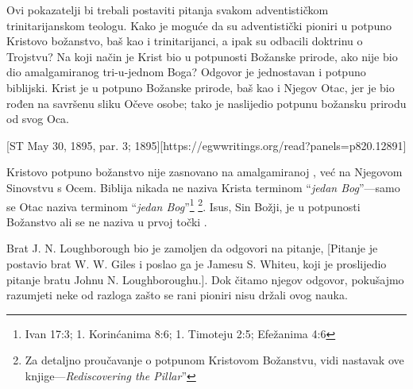 Ovi pokazatelji bi trebali postaviti pitanja svakom adventističkom trinitarijanskom teologu. Kako je moguće da su adventistički pioniri u potpuno Kristovo božanstvo, baš kao i trinitarijanci, a ipak su odbacili doktrinu o Trojstvu? Na koji način je Krist bio u potpunosti Božanske prirode, ako nije bio dio amalgamiranog tri-u-jednom Boga? Odgovor je jednostavan i potpuno biblijski. Krist je u potpuno Božanske prirode, baš kao i Njegov Otac, jer je bio rođen na savršenu sliku Očeve osobe; tako je naslijedio potpunu božansku prirodu od svog Oca.

[ST May 30, 1895, par. 3; 1895][https://egwwritings.org/read?panels=p820.12891]

Kristovo potpuno božanstvo nije zasnovano na amalgamiranoj , već na Njegovom Sinovstvu s Ocem. Biblija nikada ne naziva Krista terminom “\textit{jedan Bog}”—samo se Otac naziva terminom “\textit{jedan Bog}”\footnote{Ivan 17:3; 1. Korinćanima 8:6; 1. Timoteju 2:5; Efežanima 4:6} \footnote{Za detaljno proučavanje o potpunom Kristovom Božanstvu, vidi nastavak ove knjige—\textit{Rediscovering the Pillar}”}. Isus, Sin Božji, je u potpunosti Božanstvo ali se ne naziva  u prvoj točki .


Brat J. N. Loughborough bio je zamoljen da odgovori na pitanje, [Pitanje je postavio brat W. W. Giles i poslao ga je Jamesu S. Whiteu, koji je proslijedio pitanje bratu Johnu N. Loughboroughu.]. Dok čitamo njegov odgovor, pokušajmo razumjeti neke od razloga zašto se rani pioniri nisu držali ovog nauka.


